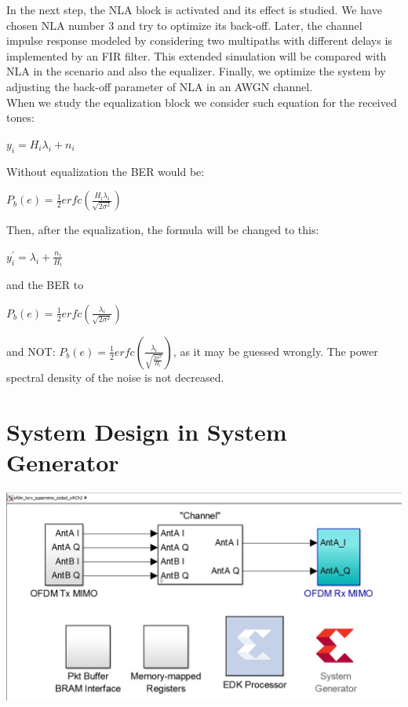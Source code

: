 In the next step, the NLA block is activated and its effect is studied. We have chosen NLA number 3 and try to optimize its back-off.
Later, the channel impulse response modeled by considering two multipaths with different delays is implemented by an FIR filter. This extended simulation will be compared with NLA in the scenario and also the equalizer. Finally, we optimize the system by adjusting the back-off parameter of NLA in an AWGN channel.\\
When we study the equalization block we consider such equation for the received tones:
\begin{center}
$y_{i}= H_{i} \lambda_{i} + n_{i}$\\
\end{center}
Without equalization the BER would be:
\begin{center}
$P_{b}(e)= \frac{1}{2}erfc(\frac{H_{i} \lambda_{i}}{\sqrt{2 \sigma^{2}}})$\\
\end{center}
Then, after the equalization, the formula will be changed to this:\\
\begin{center}
$y^{\prime}_{i}= \lambda_{i} + \frac{n_{i}}{H_{i}}$\\
\end{center}
and the BER to
\begin{center}
 $P_{b}(e)= \frac{1}{2}erfc(\frac{\lambda_{i}}{\sqrt{2 \sigma^{2}}})$\\
\end{center}
and NOT: $P_{b}(e)= \frac{1}{2}erfc(\frac{\lambda_{i}}{\sqrt{\frac{2 \sigma^{2}}{H_{i}}}})$, as it may be guessed wrongly. The power spectral density of the noise is not decreased.
\section{System Design in System Generator}
\label{sec_anasim}

\begin{center}
\includegraphics[width=\textwidth]{content/fig/system.JPG}
\label{ofdm_system}
\end{center}


